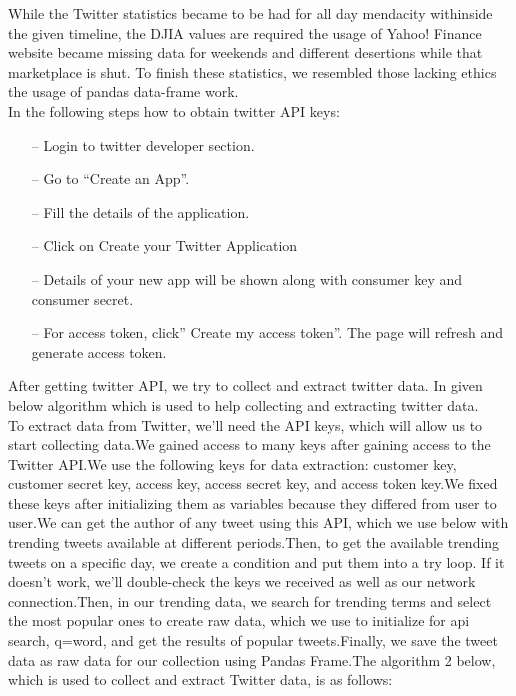 While the Twitter statistics became to be had for all day mendacity withinside the given timeline, the DJIA values are required the usage of Yahoo! Finance website became missing data for weekends and different desertions while that marketplace is shut. To finish these statistics, we resembled those lacking ethics the usage of pandas data-frame work.\cite{noauthor_count_2020}\\

In the following steps how to obtain twitter API keys:
\begin{itemize}
    \item[--] Login to twitter developer section.
    \item[--] Go to “Create an App”.
    \item[--] Fill the details of the application.
    \item[--] Click on Create your Twitter Application
    \item[--] Details of your new app will be shown along with consumer key and consumer secret.
    \item[--] For access token, click” Create my access token”. The page will refresh and generate access token.
\end{itemize}
    
After getting twitter API, we try to collect and extract twitter data. In given below algorithm which is used to help collecting and extracting twitter data.\\

To extract data from Twitter, we'll need the API keys, which will allow us to start collecting data.We gained access to many keys after gaining access to the Twitter API.We use the following keys for data extraction: customer key, customer secret key, access key, access secret key, and access token key.We fixed these keys after initializing them as variables because they differed from user to user.We can get the author of any tweet using this API, which we use below with trending tweets available at different periods.Then, to get the available trending tweets on a specific day, we create a condition and put them into a try loop. If it doesn't work, we'll double-check the keys we received as well as our network connection.Then, in our trending data, we search for trending terms and select the most popular ones to create raw data, which we use to initialize for api search, q=word, and get the results of popular tweets.Finally, we save the tweet data as raw data for our collection using Pandas Frame.The algorithm 2 below, which is used to collect and extract Twitter data, is as follows:\\

